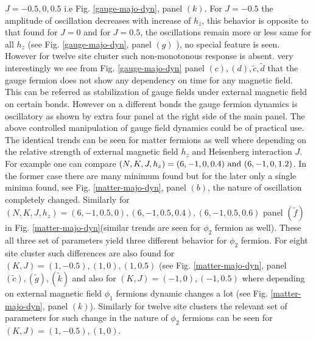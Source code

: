 \documentclass[aps,amsmath,twocolumn,amssymb,floatfix,showpacs,superscriptaddress,nofootinbib,longbibliography]{revtex4-1}
\begin{document}
$J=-0.5, 0, 0.5$ i.e Fig. \ref{gauge-majo-dyn}, panel $(k)$. For $J=-0.5$ the amplitude of oscillation decreases with increase of $h_z$, this behavior is opposite to that found for $J=0$ and for $J=0.5$, the oscillations remain more or less same for all $h_z$ (see Fig. \ref{gauge-majo-dyn}, panel $(g)$ ), no special feature is seen.  However for twelve site cluster such non-monotonous response is absent. very interestingly we see from Fig. \ref{gauge-majo-dyn} panel $(c), (d), \tilde{c}, \tilde{d}$ that the gauge fermion does not show any dependency on time for any magnetic field. This can be referred as stabilization of gauge fields under external magnetic field on certain bonds. However on a different bonds the gauge fermion dynamics is oscillatory as shown by extra four panel at the right side of the main panel. The above controlled manipulation of gauge field dynamics could be of practical use.\\
\indent
The identical trends can be seen for matter fermions as well where depending on the relative strength of external magnetic field $h_z$ and Heisenberg interaction $J$. For example one can compare $(N,K,J,h_z)=(6,-1,0,0.4)~ {\rm and}~ (6,-1,0,1.2)$. In the former case there are many minimum found but for the later only a single minima found, see Fig. \ref{matter-majo-dyn}, panel $(b)$, the nature of oscillation completely changed. Similarly for $(N,K,J,h_z)=(6,-1,0.5,0), (6,-1,0.5,0.4), (6,-1,0.5,0.6)$ panel $(\tilde{f})$ in Fig. \ref{matter-majo-dyn}(similar trends are seen  for $\phi_2$ fermion as well). These all three set of parameters yield three different behavior for $\phi_2$ fermion. For eight site cluster such differences are also found for $(K,J)=(1,-0.5), (1,0), (1,0.5)$ (see Fig. \ref{matter-majo-dyn}, panel $(\tilde{c}),(\tilde{g}),(\tilde{k})$ and also for $(K,J)=(-1,0), (-1,0.5)$ where depending on external magnetic field $\phi_1$ fermions dynamic changes a lot (see Fig. \ref{matter-majo-dyn}, panel $(k)$). Similarly for twelve site clusters the relevant set of parameters for such change in the nature of $\phi_2$ fermions can be seen for $(K,J)=(1,-0.5), (1,0)$. \\
\indent
\end{document}
